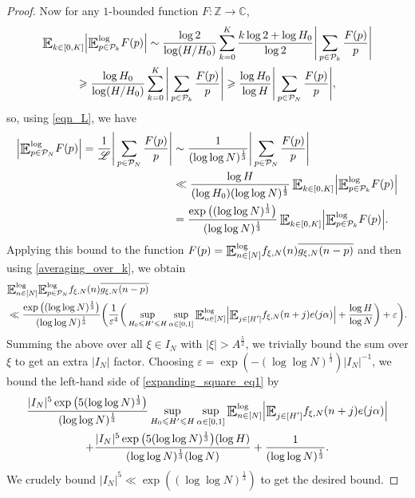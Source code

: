 \documentclass[letter,11pt]{article}
\theoremstyle{plain} %
\theoremstyle{definition} %
\theoremstyle{plain}
\theoremstyle{plain}
\theoremstyle{plain}
\numberwithin{equation}{section}
\newcommand{\Z}{\mathbb{Z}}
\newcommand{\C}{\mathbb{C}}
\renewcommand{\epsilon}{\varepsilon}
\renewcommand{\leq}{\leqslant}
\renewcommand{\geq}{\geqslant}
\newcommand{\E}{\raisebox{-0.4ex}{\scalebox{1.4}[1.3]{$\mathbb{E}$}}}
\newcommand{\Esub}[1]{\raisebox{-0.4ex}{\scalebox{1.4}[1.3]{$\mathbb{E}$}}\raisebox{-0.35ex}{\ensuremath{_{\scriptstyle #1}}}}
\newcommand{\logE}{{\E}^{\log}}
\newcommand{\1}{\mathbbm{1}}
\newcommand{\f}{f_{\xi,N}}
\newcommand{\Pc}{\mathcal{P}}
\begin{document}
\begin{proof}
Now for any $1$-bounded function $F\colon\Z\to\C$,  
\begin{multline*}
    \Esub{k\in[0,K]}\Big|\logE_{p\in\Pc_k} F(p)\Big|
    \sim \frac{\log2}{\log(H/H_0)}\sum_{k=0}^K\frac{k\log2+\log{H_0}}{\log2}\Bigg|\sum_{p\in\Pc_k}\frac{F(p)}{p}\Bigg| \\
    \geq \frac{\log{H_0}}{\log(H/H_0)}\sum_{k=0}^K\Bigg|\sum_{p\in\Pc_k}\frac{F(p)}{p}\Bigg| 
    \geq \frac{\log{H_0}}{\log{H}}\Bigg|\sum_{p\in\Pc_N}\frac{F(p)}{p}\Bigg|,
\end{multline*}
so, using \eqref{eqn_L}, we have
\begin{align*}
    \Big|\logE_{p\in\Pc_N}F(p)\Big|
    = \frac{1}{\mathscr{L}}\Bigg|\sum_{p\in\Pc_N}\frac{F(p)}{p}\Bigg|
    & \sim \frac{1}{(\log\log{N})^\frac{1}{3}}\Bigg|\sum_{p\in\Pc_N}\frac{F(p)}{p}\Bigg| \\
    & \ll \frac{\log{H}}{(\log{H_0})(\log\log{N})^\frac{1}{3}}\,\Esub{k\in[0,K]}\Big|\logE_{p\in\Pc_k}F(p)\Big| \\
    & = \frac{\exp\big((\log\log{N})^\frac{1}{3}\big)}{(\log\log{N})^\frac{1}{3}}\,\Esub{k\in[0,K]}\Big|\logE_{p\in\Pc_k}F(p)\Big|.
\end{align*}
Applying this bound to the function $F(p) = \logE_{n\in[N]}\f(n)\overline{g_{\xi,N}(n-p)}$ and then using \eqref{averaging_over_k}, we obtain
\begin{align*}
    & \logE_{n\in[N]}\logE_{p\in\Pc_N}\f(n)\overline{g_{\xi,N}(n-p)} \\
    & \ll \frac{\exp\big((\log\log{N})^\frac{1}{3}\big)}{(\log\log{N})^\frac{1}{3}}\bigg(\frac{1}{\epsilon^4}\bigg(\sup_{H_0\leq H'\leq H}\sup_{\alpha\in[0,1]}\logE_{n\in[N]}\Big|\Esub{j\in[H']}\f(n+j)e(j\alpha)\Big| + \frac{\log{H}}{\log{N}}\bigg) + \epsilon\bigg).
\end{align*}
Summing the above over all $\xi\in I_N$ with $|\xi|>A^\frac{5}{2}$, we trivially bound the sum over $\xi$ to get an extra $|I_N|$ factor. Choosing $\epsilon = \exp(-(\log\log{N})^\frac{1}{3})|I_N|^{-1}$, we bound the left-hand side of \eqref{expanding_square_eq1} by
\begin{multline*}
    \frac{|I_N|^5 \exp\big(5(\log\log{N})^\frac{1}{3}\big)}{(\log\log{N})^\frac{1}{3}}\sup_{H_0\leq H'\leq H}\sup_{\alpha\in[0,1]}\logE_{n\in[N]}\Big|\Esub{j\in[H']}\f(n+j)e(j\alpha)\Big| \\
    + \frac{|I_N|^5 \exp\big(5(\log\log{N})^\frac{1}{3}\big)(\log{H})}{(\log\log{N})^\frac{1}{3}(\log{N})}
    + \frac{1}{(\log\log{N})^\frac{1}{3}}.
\end{multline*}
We crudely bound $|I_N|^5 \ll \exp((\log\log{N})^\frac{1}{3})$ to get the desired bound.
\end{proof}
\end{document}
